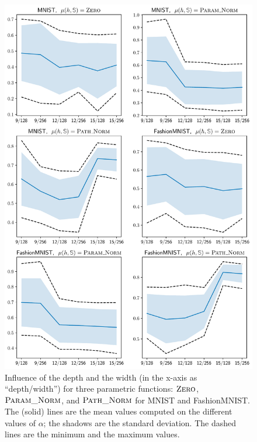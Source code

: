 \begin{figure}
    \centering
    \includegraphics[width=0.82\linewidth]{chapter_7/figures/influence_depth_summary.pdf}
    \caption[Influence of the Depth/Width]{
    Influence of the depth and the width (in the x-axis as ``depth/width'') for three parametric functions: $\text{\sc Zero}$, $\text{\sc Param\_Norm}$, and $\text{\sc Path\_Norm}$ for MNIST and FashionMNIST.
    The (solid) lines are the mean values computed on the different values of $\alpha$; the shadows are the standard deviation. 
    The dashed lines are the minimum and the maximum values.
    }
    \label{chap:dis-mu:fig:influence-depth}
\end{figure}

